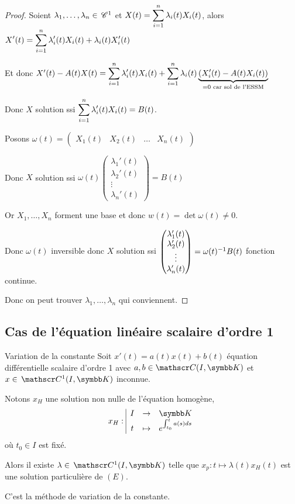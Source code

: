 \begin{proof}
    Soient $\lambda_1, \dots, \lambda_n \in \,\mathscr C^{1}$ et $X(t) = \displaystyle \sum_{i = 1}^{n} \lambda_i(t) X_i(t)$, alors
    $\displaystyle X'(t) = \sum_{i = 1}^{n} \lambda_i'(t) X_i(t) + \lambda_i(t) X_i'(t)$

    Et donc $X'(t) - A(t) X(t) = \displaystyle \sum_{i = 1}^{n} \lambda_i'(t) X_i(t) + \sum_{i = 1}^{n} \lambda_i(t) \underbrace{(X_i'(t) - A(t) X_i(t))}_{ = 0 \text{ car sol de l'ESSM}}$

    Donc $X$ solution ssi $\displaystyle \sum_{i = 1}^{n} \lambda_i'(t) X_i(t) = B(t)$.

    Posons $\omega(t) = \begin{pmatrix}
    X_1(t) & X_2(t) & \dots & X_n(t)
    \end{pmatrix}$

    Donc $X$ solution ssi $\omega(t) \begin{pmatrix}
    \lambda_1'(t) \\ \lambda_2'(t) \\ \vdots \\ \lambda_n'(t)
    \end{pmatrix} = B(t)$

    Or $X_1, \dots, X_n$ forment une base et donc $w(t) = \det \omega(t) \neq 0$.

    Donc $\omega(t)$ inversible donc $X$ solution ssi $\begin{pmatrix}
    \lambda_1'(t) \\ \lambda_2'(t) \\ \vdots \\ \lambda_n'(t)
    \end{pmatrix} = \omega(t)^{-1} B(t)$ fonction continue. 

    Donc on peut trouver $\lambda_1, \dots, \lambda_n$ qui conviennent. 
\end{proof}


\subsection{Cas de l'équation linéaire scalaire d'ordre 1}

\begin{theoreme}{Variation de la constante}{}
    Soit $x'(t) = a(t) x(t) + b(t)$ équation différentielle scalaire d'ordre 1 avec 
    $a, b \in \mathscr C (I, \K)$ et $x \in \mc 1(I, \K)$ inconnue. 

    Notons $x_H$ une solution non nulle de l'équation homogène, 
    $$\fonction{x_H}{I}{\K}{t}{e^{\int_{t_0}^t a(s) ds}}$$ où $t_0 \in I$ est fixé.

    Alors il existe $\lambda \in \mc 1(I, \K)$ telle que 
    $x_p : t \mapsto \lambda(t) x_H(t)$ est une solution particulière de $(E)$. 

    C'est la méthode de variation de la constante. 
\end{theoreme}

